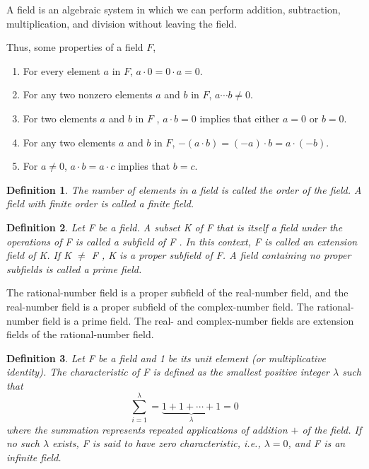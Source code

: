 \documentclass[11pt]{article}
\newtheorem{definition}{Definition}
\begin{document}
A field is an algebraic system in which we can perform addition, subtraction, multiplication, and division without leaving the field.

Thus, some properties of a field $F$,
\begin{enumerate}
\item For every element $a$ in $F$, $ a \cdot 0 = 0 \cdot a = 0$.
\item For any two nonzero elements $a$ and $b$ in $F$, $a \cdots b \neq 0 $.
\item For two elements $a$ and $b$ in $F$ , $a \cdot b = 0$ implies that either $a = 0$ or $b = 0$.
\item For any two elements $a$ and $b$ in $F$, $-(a \cdot b) = (-a) \cdot b = a \cdot (-b)$.
\item For $a \neq 0$, $a \cdot b = a \cdot c$ implies that $b = c$.
\end{enumerate}


\begin{definition}
  The number of elements in a field is called the order of the field. A field with finite order is called a finite field.
\end{definition}

\begin{definition}
 Let F be a field. A subset K of F that is itself a field under the operations of F is called a subfield of F . In this context, F is called an extension field of K.
 If K $\neq$ F , K is a proper subfield of F. A field containing no proper subfields is called a prime field.
\end{definition}

The rational-number field is a proper subfield of the real-number field, and the real-number field is a proper subfield of the complex-number field. 
The rational-number field is a prime field. The real- and complex-number fields are extension fields of the rational-number field.

\begin{definition}
  Let F be a field and 1 be its unit element (or multiplicative identity). The characteristic of F is defined as the smallest positive integer $\lambda$ such that
  \[
  \sum_{i=1}^\lambda = \underbrace{1 + 1 + \cdots + 1}_\lambda = 0
  \]
  where the summation represents repeated applications of addition $+$ of the field. If no such $\lambda$ exists, F is said to have zero characteristic, i.e., $\lambda = 0$, and F is an infinite field.
\end{definition}
\end{document}
